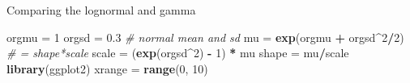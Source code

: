 \documentclass[
  ignorenonframetext,
]{beamer}
\newenvironment{Shaded}{\begin{snugshade}}{\end{snugshade}}
\newcommand{\CommentTok}[1]{\textcolor[rgb]{0.56,0.35,0.01}{\textit{#1}}}
\newcommand{\DecValTok}[1]{\textcolor[rgb]{0.00,0.00,0.81}{#1}}
\newcommand{\FloatTok}[1]{\textcolor[rgb]{0.00,0.00,0.81}{#1}}
\newcommand{\FunctionTok}[1]{\textcolor[rgb]{0.13,0.29,0.53}{\textbf{#1}}}
\newcommand{\NormalTok}[1]{#1}
\newcommand{\OtherTok}[1]{\textcolor[rgb]{0.56,0.35,0.01}{#1}}
\newcommand{\SpecialCharTok}[1]{\textcolor[rgb]{0.81,0.36,0.00}{\textbf{#1}}}
\begin{document}
\begin{frame}[fragile]{Comparing the lognormal and gamma}
\protect\hypertarget{comparing-the-lognormal-and-gamma}{}
\begin{Shaded}
\begin{Highlighting}[]
\NormalTok{orgmu }\OtherTok{=} \DecValTok{1}
\NormalTok{orgsd }\OtherTok{=} \FloatTok{0.3}  \CommentTok{\# normal mean and sd}
\NormalTok{mu }\OtherTok{=} \FunctionTok{exp}\NormalTok{(orgmu }\SpecialCharTok{+}\NormalTok{ orgsd}\SpecialCharTok{\^{}}\DecValTok{2}\SpecialCharTok{/}\DecValTok{2}\NormalTok{)  }\CommentTok{\# = shape*scale}
\NormalTok{scale }\OtherTok{=}\NormalTok{ (}\FunctionTok{exp}\NormalTok{(orgsd}\SpecialCharTok{\^{}}\DecValTok{2}\NormalTok{) }\SpecialCharTok{{-}} \DecValTok{1}\NormalTok{) }\SpecialCharTok{*}\NormalTok{ mu}
\NormalTok{shape }\OtherTok{=}\NormalTok{ mu}\SpecialCharTok{/}\NormalTok{scale}
\FunctionTok{library}\NormalTok{(ggplot2)}
\NormalTok{xrange }\OtherTok{=} \FunctionTok{range}\NormalTok{(}\DecValTok{0}\NormalTok{, }\DecValTok{10}\NormalTok{)}
\end{Highlighting}
\end{Shaded}
\end{frame}
\end{document}
